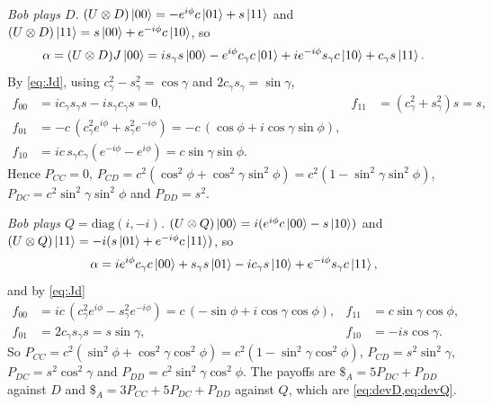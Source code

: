 \documentclass[11pt,a4paper]{article}
\begin{document}
\emph{Bob plays $D$.} $(U\otimes D)\ket{00}=-e^{i\phi}c\ket{01}+s\ket{11}$ and $(U\otimes D)\ket{11}=s\ket{00}+e^{-i\phi}c\ket{10}$, so
\[
\alpha=(U\otimes D)J\ket{00}=i s_\gamma s\ket{00}-e^{i\phi}c_\gamma c\ket{01}+ie^{-i\phi}s_\gamma c\ket{10}+c_\gamma s\ket{11}.
\]
By \cref{eq:Jd}, using $c_\gamma^2-s_\gamma^2=\cos\gamma$ and $2c_\gamma s_\gamma=\sin\gamma$,
\begin{align*}
f_{00}&=ic_\gamma s_\gamma s-is_\gamma c_\gamma s=0, & f_{11}&=(c_\gamma^2+s_\gamma^2)s=s,\\
f_{01}&=-c\,(c_\gamma^2e^{i\phi}+s_\gamma^2e^{-i\phi})=-c\,(\cos\phi+i\cos\gamma\sin\phi),\\ f_{10}&=ic\,s_\gamma c_\gamma(e^{-i\phi}-e^{i\phi})=c\sin\gamma\sin\phi .
\end{align*}
Hence $P_{CC}=0$, $P_{CD}=c^2(\cos^2\phi+\cos^2\gamma\sin^2\phi)=c^2(1-\sin^2\gamma\sin^2\phi)$, $P_{DC}=c^2\sin^2\gamma\sin^2\phi$ and $P_{DD}=s^2$.

\emph{Bob plays $Q=\mathrm{diag}(i,-i)$.} $(U\otimes Q)\ket{00}=i(e^{i\phi}c\ket{00}-s\ket{10})$ and $(U\otimes Q)\ket{11}=-i(s\ket{01}+e^{-i\phi}c\ket{11})$, so
\[
\alpha=ie^{i\phi}c_\gamma c\ket{00}+s_\gamma s\ket{01}-ic_\gamma s\ket{10}+e^{-i\phi}s_\gamma c\ket{11},
\]
and by \cref{eq:Jd}
\begin{align*}
f_{00}&=ic\,(c_\gamma^2e^{i\phi}-s_\gamma^2e^{-i\phi})=c\,(-\sin\phi+i\cos\gamma\cos\phi), & f_{11}&=c\sin\gamma\cos\phi,\\
f_{01}&=2c_\gamma s_\gamma s=s\sin\gamma, & f_{10}&=-is\cos\gamma .
\end{align*}
So $P_{CC}=c^2(\sin^2\phi+\cos^2\gamma\cos^2\phi)=c^2(1-\sin^2\gamma\cos^2\phi)$, $P_{CD}=s^2\sin^2\gamma$, $P_{DC}=s^2\cos^2\gamma$ and $P_{DD}=c^2\sin^2\gamma\cos^2\phi$. The payoffs are $\$_A=5P_{DC}+P_{DD}$ against $D$ and $\$_A=3P_{CC}+5P_{DC}+P_{DD}$ against $Q$, which are \cref{eq:devD,eq:devQ}.
\end{document}
